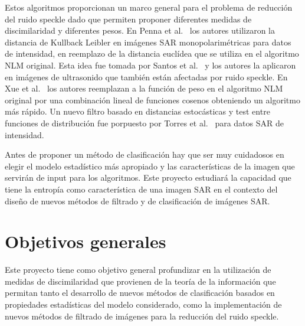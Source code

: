 \documentclass[11pt]{article}
\begin{document}
Estos algoritmos proporcionan un marco general para el problema de reducción del ruido speckle dado que permiten proponer diferentes medidas de discimilaridad y diferentes pesos. En Penna et al.~\cite{Penna2013} los autores utilizaron la distancia de Kullback Leibler en imágenes SAR monopolarimétricas para datos de intensidad, en reemplazo de la distancia euclídea que se utiliza en el algoritmo NLM original. Esta idea fue tomada por Santos et al.~\cite{Santos2017} y los autores la aplicaron en imágenes de ultrasonido que también están afectadas por ruido speckle. En Xue et al.~\cite{Xue2013} los autores reemplazan a la función de peso en el algoritmo NLM original por una combinación lineal de funciones cosenos obteniendo un algoritmo más rápido. Un nuevo filtro basado en distancias estocásticas y test entre funciones de distribución fue porpuesto por Torres et al.~\cite{Torres2012} para datos SAR de intensidad.

Antes de proponer un método de clasificación hay que ser muy cuidadosos en elegir el modelo estadístico más apropiado y las características de la imagen que servirán de input para los algoritmos. Este proyecto estudiará la capacidad que tiene la entropía como característica de una imagen SAR en el contexto del diseño de nuevos métodos de filtrado y de clasificación de imágenes SAR.

\section{Objetivos generales}



Este proyecto tiene como objetivo general profundizar en la utilización de medidas de discimilaridad que provienen de la teoría de la información que permitan tanto el desarrollo de nuevos métodos de clasificación basados en propiedades estadísticas del modelo considerado, como la implementación de nuevos métodos de filtrado de imágenes para la reducción del ruido speckle.
\end{document}
